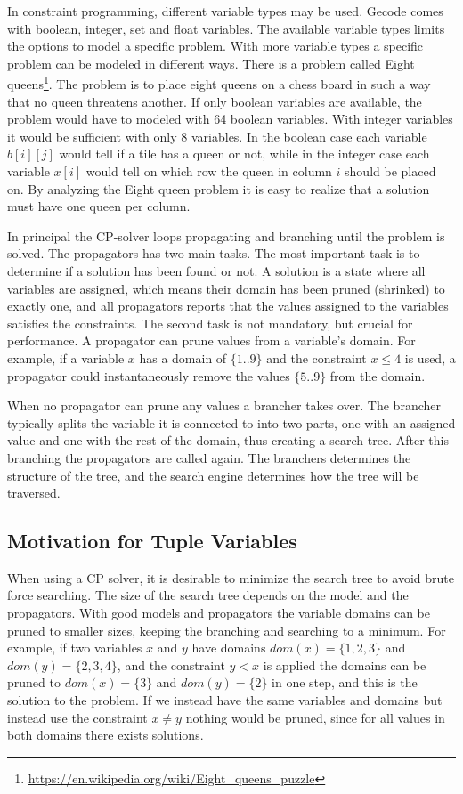 \documentclass[a4paper,11pt]{article}
\begin{document}
In constraint programming, different variable types may be used. Gecode comes with boolean, integer, set and float variables. The available variable types limits the options to model a specific problem. With more variable types a specific problem can be modeled in different ways. There is a problem called Eight queens\footnote{\url{https://en.wikipedia.org/wiki/Eight_queens_puzzle}}. The problem is to place eight queens on a chess board in such a way that no queen threatens another. If only boolean variables are available, the problem would have to modeled with 64 boolean variables. With integer variables it would be sufficient with only 8 variables. In the boolean case each variable $b[i][j]$ would tell if a tile has a queen or not, while in the integer case each variable $x[i]$ would tell on which row the queen in column $i$ should be placed on. By analyzing the Eight queen problem it is easy to realize that a solution must have one queen per column.

In principal the CP-solver loops propagating and branching until the problem is solved. The propagators has two main tasks. The most important task is to determine if a solution has been found or not. A solution is a state where all variables are assigned, which means their domain has been pruned (shrinked) to exactly one, and all propagators reports that the values assigned to the variables satisfies the constraints. The second task is not mandatory, but crucial for performance. A propagator can prune values from a variable's domain. For example, if a variable $x$ has a domain of $\{1..9\}$ and the constraint $x\le 4$ is used, a propagator could instantaneously remove the values $\{5..9\}$ from the domain.

When no propagator can prune any values a brancher takes over. The brancher typically splits the variable it is connected to into two parts, one with an assigned value and one with the rest of the domain, thus creating a search tree. After this branching the propagators are called again. The branchers determines the structure of the tree, and the search engine determines how the tree will be traversed. 

\subsection{Motivation for Tuple Variables}
When using a CP solver, it is desirable to minimize the search tree to avoid brute force searching. The size of the search tree depends on the model and the propagators. With good models and propagators the variable domains can be pruned to smaller sizes, keeping the branching and searching to a minimum. For example, if two variables $x$ and $y$ have domains $dom(x)=\{1,2,3\}$ and $dom(y)=\{2,3,4\}$, and the constraint $y<x$ is applied the domains can be pruned to $dom(x)=\{3\}$ and $dom(y)=\{2\}$ in one step, and this is the solution to the problem. If we instead have the same variables and domains but instead use the constraint $x\neq y$ nothing would be pruned, since for all values in both domains there exists solutions. 
\end{document}
